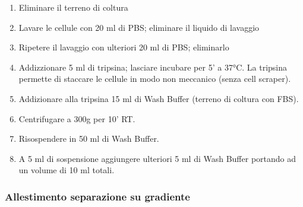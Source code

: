 \begin{enumerate}

    \item Eliminare il terreno di coltura

    \item Lavare le cellule con 20 ml di PBS; eliminare il liquido di lavaggio

    \item Ripetere il lavaggio con ulteriori 20 ml di PBS; eliminarlo

    \item Addizzionare 5 ml di tripsina; lasciare incubare per 5' a 37°C.
    La tripsina permette di staccare le cellule in modo non meccanico (senza cell scraper).

    \item Addizionare alla tripsina 15 ml di Wash Buffer (terreno di coltura con FBS).

    \item Centrifugare a 300g per 10' RT.

    \item Risospendere in 50 ml di Wash Buffer.

    \item A 5 ml di sospensione aggiungere ulteriori 5 ml di Wash Buffer portando
    ad un volume di 10 ml totali.

\end{enumerate}

\subsubsection{Allestimento separazione su gradiente}

